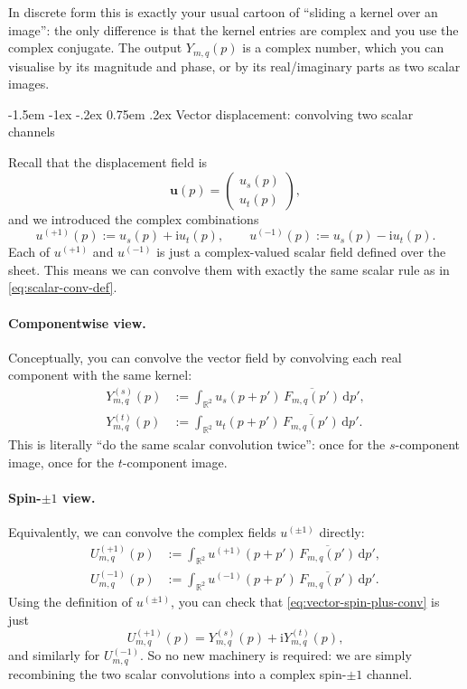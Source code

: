\documentclass[12pt]{article}
\makeatletter
\renewcommand\subsection{\@startsection{subsection}{2}{\z@}%
                                     {-1.5em \@plus -1ex \@minus -.2ex}%
                                     {0.75em \@plus .2ex}%
                                     {\normalfont\large\bfseries}}
\makeatother
\begin{document}
In discrete form this is exactly your usual cartoon of ``sliding a
kernel over an image'': the only difference is that the kernel entries
are complex and you use the complex conjugate. The output
$Y_{m,q}(p)$ is a complex number, which you can visualise by its
magnitude and phase, or by its real/imaginary parts as two scalar
images.

\subsection{Vector displacement: convolving two scalar channels}

Recall that the displacement field is
\[
  \mathbf{u}(p)
  =
  \begin{pmatrix}
    u_s(p)\\[3pt]u_t(p)
  \end{pmatrix},
\]
and we introduced the complex combinations
\begin{equation}
  u^{(+1)}(p) := u_s(p) + \mathrm{i}u_t(p),
  \qquad
  u^{(-1)}(p) := u_s(p) - \mathrm{i}u_t(p).
\end{equation}
Each of $u^{(+1)}$ and $u^{(-1)}$ is just a complex-valued scalar
field defined over the sheet. This means we can convolve them with
exactly the same scalar rule as in \eqref{eq:scalar-conv-def}.

\paragraph{Componentwise view.}
Conceptually, you can convolve the vector field by convolving each
real component with the same kernel:
\begin{align}
  Y^{(s)}_{m,q}(p)
  &:=
  \int_{\mathbb{R}^2}
    u_s(p+p')\,\overline{F_{m,q}(p')}\,\mathrm{d}p',
  \\
  Y^{(t)}_{m,q}(p)
  &:=
  \int_{\mathbb{R}^2}
    u_t(p+p')\,\overline{F_{m,q}(p')}\,\mathrm{d}p'.
\end{align}
This is literally ``do the same scalar convolution twice'': once for
the $s$-component image, once for the $t$-component image.

\paragraph{Spin-$\pm1$ view.}
Equivalently, we can convolve the complex fields $u^{(\pm1)}$ directly:
\begin{align}
  U^{(+1)}_{m,q}(p)
  &:=
  \int_{\mathbb{R}^2}
    u^{(+1)}(p+p')\,\overline{F_{m,q}(p')}\,\mathrm{d}p',
  \label{eq:vector-spin-plus-conv}
  \\
  U^{(-1)}_{m,q}(p)
  &:=
  \int_{\mathbb{R}^2}
    u^{(-1)}(p+p')\,\overline{F_{m,q}(p')}\,\mathrm{d}p'.
  \label{eq:vector-spin-minus-conv}
\end{align}
Using the definition of $u^{(\pm1)}$, you can check that
\eqref{eq:vector-spin-plus-conv} is just
\[
  U^{(+1)}_{m,q}(p)
  = Y^{(s)}_{m,q}(p) + \mathrm{i}Y^{(t)}_{m,q}(p),
\]
and similarly for $U^{(-1)}_{m,q}$. So no new machinery is required:
we are simply recombining the two scalar convolutions into a complex
spin-$\pm1$ channel.
\end{document}
